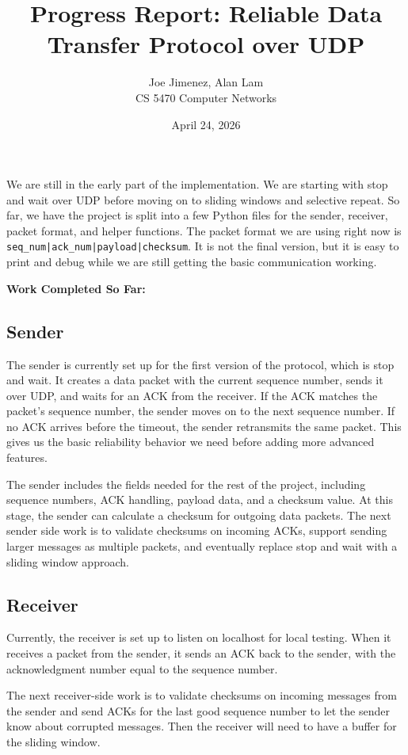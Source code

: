 \documentclass[12pt]{article}
\title{Progress Report: Reliable Data Transfer Protocol over UDP}
\author{Joe Jimenez, Alan Lam \\ CS 5470 Computer Networks}
\date{April 24, 2026}
\begin{document}
\maketitle
\noindent
We are still in the early part of the implementation. We are starting with stop and wait over UDP before moving on to sliding windows and selective repeat. So far, we have the project is split into a few Python files for the sender, receiver, packet format, and helper functions. The packet format we are using right now is \texttt{seq\_num|ack\_num|payload|checksum}. It is not the final version, but it is easy to print and debug while we are still getting the basic communication working.

\vspace{0.5em}
\noindent
\textbf{Work Completed So Far:}
\subsection*{Sender}
The sender is currently set up for the first version of the protocol, which is stop and wait. It creates a data packet with the current sequence number, sends it over UDP, and waits for an ACK from the receiver. If the ACK matches the packet's sequence number, the sender moves on to the next sequence number. If no ACK arrives before the timeout, the sender retransmits the same packet. This gives us the basic reliability behavior we need before adding more advanced features.

The sender includes the fields needed for the rest of the project, including sequence numbers, ACK handling, payload data, and a checksum value. At this stage, the sender can calculate a checksum for outgoing data packets. The next sender side work is to validate checksums on incoming ACKs, support sending larger messages as multiple packets, and eventually replace stop and wait with a sliding window approach.



\subsection*{Receiver}
Currently, the receiver is set up to listen on localhost for local testing. When it receives a packet from the sender, it sends an ACK back to the sender, with the acknowledgment number equal to the sequence number.

The next receiver-side work is to validate checksums on incoming messages from the sender and send ACKs for the last good sequence number to let the sender know about corrupted messages. Then the receiver will need to have a buffer for the sliding window.
\end{document}

